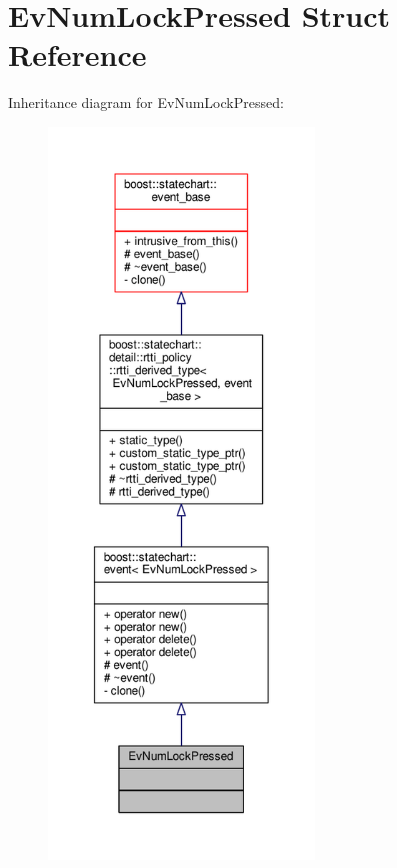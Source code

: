 \hypertarget{struct_ev_num_lock_pressed}{}\section{Ev\+Num\+Lock\+Pressed Struct Reference}
\label{struct_ev_num_lock_pressed}


Inheritance diagram for Ev\+Num\+Lock\+Pressed\+:
\nopagebreak
\begin{figure}[H]
\begin{center}
\leavevmode
\includegraphics[height=550pt]{struct_ev_num_lock_pressed__inherit__graph}
\end{center}
\end{figure}


